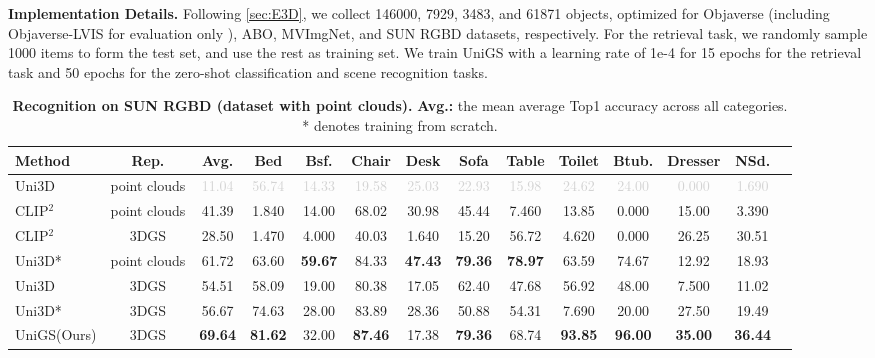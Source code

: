 \textbf{Implementation Details.} Following \cref{sec:E3D}, we collect 146000, 7929, 3483, and 61871 objects, optimized for Objaverse (including Objaverse-LVIS for evaluation only ), ABO, MVImgNet, and SUN RGBD datasets, respectively.
For the retrieval task, we randomly sample 1000 items to form the test set, and use the rest as training set.
We train UniGS with a learning rate of 1e-4 for 15 epochs for the retrieval task and 50 epochs for the zero-shot classification and scene recognition tasks.

\begin{table*}[t]
\footnotesize
		\centering
\addtolength{\tabcolsep}{-3.1pt}
 \begin{tabularx}{\textwidth}{l|c|c|ccccccccccc}
\toprule
Method & Rep. & Avg. & Bed & Bsf. & Chair & Desk & Sofa & Table & Toilet & Btub. & Dresser & NSd.\\
\midrule
Uni3D & point clouds & \textcolor{lightgray}{11.04} & \textcolor{lightgray}{56.74} & \textcolor{lightgray}{14.33} & \textcolor{lightgray}{19.58} & \textcolor{lightgray}{25.03} & \textcolor{lightgray}{22.93} & \textcolor{lightgray}{15.98} & \textcolor{lightgray}{24.62} & \textcolor{lightgray}{24.00} & \textcolor{lightgray}{0.000} & \textcolor{lightgray}{1.690} \\

\midrule

CLIP${^2}$ & point clouds & 41.39 & 1.840 & 14.00 & 68.02 & 30.98 & 45.44 & 7.460 & 13.85 & 0.000 & 15.00 & 3.390 \\

CLIP${^2}$ & 3DGS & 28.50 & 1.470 & 4.000 & 40.03 & 1.640 & 15.20 & 56.72 & 4.620 & 0.000 & 26.25 & 30.51 \\

Uni3D* & point clouds & 61.72 & 63.60 & \textbf{59.67} & 84.33 & \textbf{47.43} & \textbf{79.36} & \textbf{78.97} & 63.59 & 74.67 & 12.92 & 18.93 \\

Uni3D& 3DGS & 54.51 & 58.09 & 19.00 & 80.38 & 17.05 & 62.40 & 47.68 & 56.92 & 48.00 & 7.500 & 11.02\\

Uni3D*& 3DGS & 56.67 & 74.63 & 28.00 & 83.89 & 28.36 & 50.88 & 54.31 & 7.690 & 20.00 & 27.50 & 19.49 \\
\midrule
\rowcolor{mygray} UniGS(Ours) & 3DGS & \textbf{69.64} & \textbf{81.62} & 32.00 & \textbf{87.46} & 17.38 & \textbf{79.36} & 68.74 & \textbf{93.85} & \textbf{96.00} & \textbf{35.00} & \textbf{36.44} \\

\bottomrule
\end{tabularx}
		\caption{\textbf{Recognition on SUN RGBD (dataset with point clouds).} \textbf{Avg.: }the mean average Top1 accuracy across all categories. * denotes training from scratch.
	}
 \label{tab:recognization}
 \vspace{-5mm}
\end{table*}



